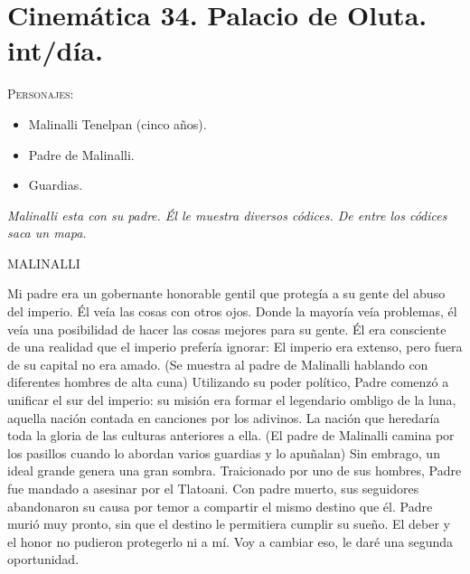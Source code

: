 \documentclass[11pt,letterpaper]{article}
\begin{document}
\section{Cinemática 34. Palacio de Oluta. int/día. }
 \textsc{Personajes}:
 \begin{itemize}
 \item Malinalli Tenelpan (cinco años).
\item Padre de Malinalli.
\item Guardias.
 \end{itemize}
\textit{Malinalli esta con su padre. Él le muestra diversos códices. De entre los códices saca un mapa.}
\begin{center}
MALINALLI
\\
\par
Mi padre era un gobernante honorable gentil que protegía a su gente del abuso del imperio. Él veía las cosas con otros ojos. Donde la mayoría veía problemas, él veía una posibilidad de hacer las cosas mejores para su gente. Él era consciente de una realidad que el imperio prefería ignorar: El imperio era extenso, pero fuera de su capital no era amado. (Se muestra al padre de Malinalli hablando con diferentes hombres de alta cuna) Utilizando su poder político, Padre comenzó a unificar el sur del imperio: su misión era formar el legendario ombligo de la luna, aquella nación contada en canciones por los adivinos. La nación que heredaría toda la gloria de las culturas anteriores a ella. (El padre de Malinalli camina por los pasillos cuando lo abordan varios guardias y lo apuñalan) Sin embrago, un ideal grande genera una gran sombra. Traicionado por uno de sus hombres, Padre fue mandado a asesinar por el Tlatoani. Con padre muerto, sus seguidores abandonaron su causa por temor a compartir el mismo destino que él. Padre murió muy pronto, sin que el destino le permitiera cumplir su sueño. El deber y el honor no pudieron protegerlo ni a mí. Voy a cambiar eso, le daré una segunda oportunidad.
\end{center}
\end{document}
